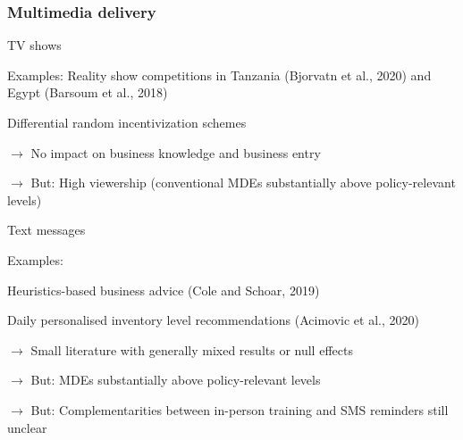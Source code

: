 \documentclass[hideothersubsections, usenames,dvipsnames,11pt]{beamer}
\newenvironment{itemize_2pt}{\itemize\addtolength{\itemsep}{2pt}}{\enditemize}
\begin{document}
\begin{frame}
\frametitle{Multimedia delivery}
TV shows
\begin{itemize_2pt}
	\item Examples: \textcolor{bdf}{Reality show competitions} in Tanzania \textcolor{camel}{(Bjorvatn et al., 2020)} and Egypt \textcolor{camel}{(Barsoum et al., 2018)}
	\item Differential random incentivization schemes
	\item[] $\rightarrow$ No impact on business knowledge and business entry 
	\item[] $\rightarrow$ But: \textcolor{bdf}{High viewership} (conventional MDEs substantially above policy-relevant levels) 
 
\end{itemize_2pt}

\pause
	
\vspace{1.0em}
	
Text messages
\begin{itemize_2pt}
	\item Examples: 
	\begin{itemize_2pt}
		\item Heuristics-based business advice \textcolor{camel}{(Cole and Schoar, 2019)}
		\item Daily personalised inventory level recommendations \textcolor{camel}{(Acimovic et al., 2020)}
	\end{itemize_2pt}
	\item[] $\rightarrow$ Small literature with generally \textcolor{camel}{mixed results or null effects}
	\item[] $\rightarrow$ But: \textcolor{bdf}{MDEs substantially above policy-relevant levels}
	\item[] $\rightarrow$ But: \textcolor{bdf}{Complementarities} between in-person training and SMS reminders still unclear
\end{itemize_2pt}
\end{frame}



\end{document}
